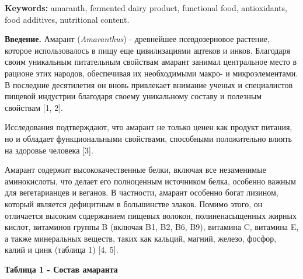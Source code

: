 {{\bfseries Keywords:} amaranth, fermented dairy product, functional food,
antioxidants, food additives, nutritional content.

{\bfseries Введение.} Амарант (\emph{Amaranthus}) - древнейшее
псевдозерновое растение, которое использовалось в пищу еще цивилизациями
ацтеков и инков. Благодаря своим уникальным питательным свойствам
амарант занимал центральное место в рационе этих народов, обеспечивая их
необходимыми макро- и микроэлементами. В последние десятилетия он вновь
привлекает внимание ученых и специалистов пищевой индустрии благодаря
своему уникальному составу и полезным свойствам {[}1, 2{]}.

Исследования подтверждают, что амарант не только ценен как продукт
питания, но и обладает функциональными свойствами, способными
положительно влиять на здоровье человека {[}3{]}.

Амарант содержит высококачественные белки, включая все незаменимые
аминокислоты, что делает его полноценным источником белка, особенно
важным для вегетарианцев и веганов. В частности, амарант особенно богат
лизином, который является дефицитным в большинстве злаков. Помимо этого,
он отличается высоким содержанием пищевых волокон, полиненасыщенных
жирных кислот, витаминов группы B (включая B1, B2, B6, B9), витамина C,
витамина E, а также минеральных веществ, таких как кальций, магний,
железо, фосфор, калий и цинк (таблица 1) {[}4, 5{]}.

{\bfseries Таблица 1 - Состав амаранта}


}
